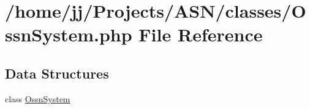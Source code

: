\hypertarget{_ossn_system_8php}{}\section{/home/jj/\+Projects/\+A\+S\+N/classes/\+Ossn\+System.php File Reference}
\label{_ossn_system_8php}
\subsection*{Data Structures}
\begin{DoxyCompactItemize}
\item 
class \hyperlink{class_ossn_system}{Ossn\+System}
\end{DoxyCompactItemize}
